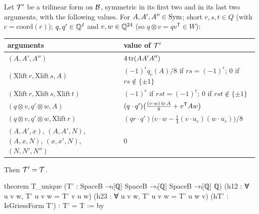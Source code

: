 \begin{theorem}\label{ch21:thm:Tunique}
Let $\mathcal{T}'$ be a trilinear form on $\mathcal{B}$, symmetric in its first two and in its last two
arguments, with the following values.  For $A,A',A''\in\mathrm{Sym}$; short $r,s,t\in Q$ (with
$c=\mathrm{coord}(r)$); $q,q'\in{\mathbb{Q}}^I$ and $v,w\in{\mathbb{Q}}^{24}$ (so $q\otimes v=qv^{\mathsf T}\in W$):
\begin{center}\small
\begin{tabular}{ll}
\toprule
arguments & value of $\mathcal{T}'$\\\midrule
$(A,A',A'')$ & $4\operatorname{tr}(AA'A'')$\\
$(\mathrm{Xlift}\,r,\mathrm{Xlift}\,s,A)$ & $(-1)^{\epsilon}q_c(A)/8$ if $rs=(-1)^\epsilon$; $0$ if $rs\notin\{\pm1\}$\\
$(\mathrm{Xlift}\,r,\mathrm{Xlift}\,s,\mathrm{Xlift}\,t)$ & $(-1)^\epsilon$ if $rst=(-1)^\epsilon$; $0$ if $rst\notin\{\pm1\}$\\
$(q\otimes v,q'\otimes w,A)$ & $(q\cdot q')\bigl(\tfrac{(v\cdot w)\operatorname{tr} A}8+v^{\mathsf T}Aw\bigr)$\\
$(q\otimes v,q'\otimes w,\mathrm{Xlift}\,r)$ & $(qr\cdot q')\bigl(v\cdot w-\tfrac14(v\cdot u_c)(w\cdot u_c)\bigr)/8$\\
$(A,A',x)$, $(A,A',N)$, $(A,x,N)$, $(x,x',N)$, $(N,N',N'')$ & $0$\\
\bottomrule
\end{tabular}
\end{center}
Then $\mathcal{T}'=\mathcal{T}$.
\end{theorem}
\begin{leancode}
theorem T_unique (T' : SpaceB →ₗ[ℚ] SpaceB →ₗ[ℚ] SpaceB →ₗ[ℚ] ℚ)
    (h12 : ∀ u v w, T' u v w = T' v u w) (h23 : ∀ u v w, T' u v w = T' u w v)
    (hT' : IsGriessForm T') : T' = T := by
\end{leancode}
